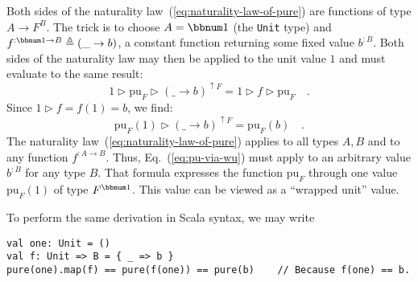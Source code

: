Both sides of the naturality law~(\ref{eq:naturality-law-of-pure})
are functions of type $A\rightarrow F^{B}$. The trick is to choose
$A=\bbnum 1$ (the \lstinline!Unit! type) and $f^{:\bbnum 1\rightarrow B}\triangleq(\_\rightarrow b)$,
a constant function returning some fixed value $b^{:B}$. Both sides
of the naturality law may then be applied to the unit value $1$ and
must evaluate to the same result:
\[
1\triangleright\text{pu}_{F}\triangleright(\_\rightarrow b)^{\uparrow F}=1\triangleright f\triangleright\text{pu}_{F}\quad.
\]
Since $1\triangleright f=f(1)=b$, we find:
\begin{equation}
\text{pu}_{F}(1)\triangleright(\_\rightarrow b)^{\uparrow F}=\text{pu}_{F}(b)\quad.\label{eq:pu-via-wu}
\end{equation}
The naturality law~(\ref{eq:naturality-law-of-pure}) applies to
all types $A,B$ and to any function $f^{:A\rightarrow B}$. Thus,
Eq.~(\ref{eq:pu-via-wu}) must apply to an arbitrary value $b^{:B}$
for any type $B$. That formula expresses the function $\text{pu}_{F}$
through one value $\text{pu}_{F}(1)$ of type $F^{\bbnum 1}$. This
value can be viewed as a \textsf{``}wrapped unit\textsf{''}
value. 

To perform the same derivation in Scala syntax, we may write
\begin{lstlisting}
val one: Unit = ()
val f: Unit => B = { _ => b }
pure(one).map(f) == pure(f(one)) == pure(b)    // Because f(one) == b.
\end{lstlisting}

